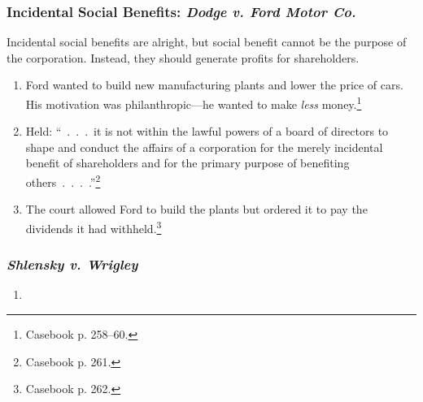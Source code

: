 \subsubsection{Incidental Social Benefits: \emph{Dodge v. Ford Motor Co.}}

Incidental social benefits are alright, but social benefit cannot be the 
purpose of the corporation. Instead, they should generate profits for 
shareholders.

\begin{enumerate}
    \item Ford wanted to build new manufacturing plants and lower the price of 
    cars. His motivation was philanthropic---he wanted to make \emph{less} 
    money.\footnote{Casebook p. 258--60.}
    \item Held: ``~.~.~.~it is not within the lawful powers of a board of 
    directors to shape and conduct the affairs of a corporation for the merely 
    incidental benefit of shareholders and for the primary purpose of 
    benefiting others~.~.~.~.''\footnote{Casebook p. 261.}
    \item The court allowed Ford to build the plants but ordered it to pay 
    the dividends it had withheld.\footnote{Casebook p. 262.}
\end{enumerate}

\subsubsection{\emph{Shlensky v. Wrigley}}

\begin{enumerate}
    \item %
\end{enumerate}

